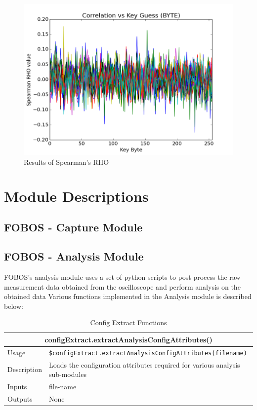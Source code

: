 \documentclass{llncs}
\numberwithin{algorithm}{chapter}
\begin{document}
\begin{figure}[h]
\begin{center}
\includegraphics[scale=0.8]{figures/spearman-rho}
\caption{\label{fig:spcorrplt}{Results of Spearman's RHO}}
\end{center} 
\vspace{-3ex}
\end{figure}

\chapter{Module Descriptions}
\section{FOBOS - Capture Module}
\section{FOBOS - Analysis Module}
FOBOS's analysis module uses a set of python scripts to post process the raw 
measurement data obtained from the oscilloscope and perform analysis on the obtained data
Various functions implemented in the Analysis module is described below:\newline

\begin{table}
\caption{Config Extract Functions}
\begin{tabular}{ |p{2cm}||p{11cm}|  }
 \hline
 \multicolumn{2}{|c|}{\cellcolor{teal}\textbf{configExtract.extractAnalysisConfigAttributes()}} \\
 \hline
 Usage & \texttt{\$configExtract.extractAnalysisConfigAttributes(filename)}\\ \hline
 Description & Loads the configuration attributes required for various analysis sub-modules\\ \hline
 Inputs & file-name \\ \hline
 Outputs & None\\ \hline
\end{tabular}
\end{table}
\end{document}
